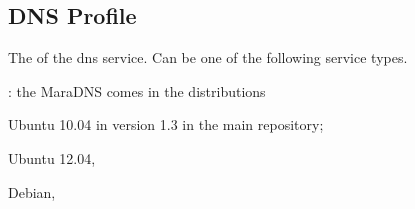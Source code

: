 \label{sec:dns_profile}
\subsection{DNS Profile}


The  of the dns service. Can be one of the following 
service types.
\begin{asparaitem}
%
\item[\qcode{maradns}:] 
the MaraDNS comes in the distributions 
\begin{compactitem}
\item[\TheDistribution{ubuntu}] Ubuntu 10.04 in version 1.3 in the main repository;
\item[\TheDistribution{ubuntu}] Ubuntu 12.04,
\item[\TheDistribution{debian}] Debian,
\end{compactitem}
%
\end{asparaitem}


